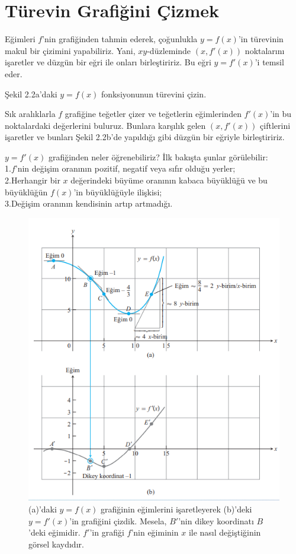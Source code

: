 \section{\protect Türevin Grafiğini Çizmek}\label{bolumetiketi}
Eğimleri $f$'nin grafiğinden tahmin ederek, çoğunlukla $y=f(x)$'in türevinin makul bir çizimini yapabiliriz. Yani, $xy$-düzleminde $(x,f'(x))$ noktalarını işaretler ve düzgün bir eğri ile onları birleştiririz. Bu eğri $y=f'(x)$'i temsil eder.
\begin{ornek}
Şekil 2.2a'daki $y=f(x)$ fonksiyonunun türevini çizin.
\end{ornek}
\begin{cozum} Sık aralıklarla $f$ grafiğine teğetler çizer ve teğetlerin eğimlerinden $f'(x)$'in bu noktalardaki değerlerini buluruz. Bunlara karşılık gelen $(x,f'(x))$ çiftlerini işaretler ve bunları Şekil 2.2b'de yapıldığı gibi düzgün bir eğriyle birleştiririz.
	

$y=f'(x)$ grafiğinden neler öğrenebiliriz? İlk bakışta şunlar görülebilir:\\
1.$f$'nin değişim oranının pozitif, negatif veya sıfır olduğu yerler;\\
2.Herhangir bir $x$ değerindeki büyüme oranının kabaca büyüklüğü ve bu büyüklüğün $f(x)$'in büyüklüğüyle ilişkisi;\\
3.Değişim oranının kendisinin artıp artmadığı.
\begin{figure}[H]
	\centering
	\includegraphics[width=0.7\linewidth]{turevcizim.png}
	\caption{(a)'daki $y=f(x)$ grafiğinin eğimlerini işaretleyerek (b)'deki $y=f'(x)$'in grafiğini çizdik. Mesela, $B'$'nin dikey koordinatı $B$'deki eğimidir. $f'$'in grafiği $f$'nin eğiminin $x$ ile nasıl değiştiğinin görsel kaydıdır.}
	\label{fig:ornekresim}
\end{figure}
\end{cozum}
